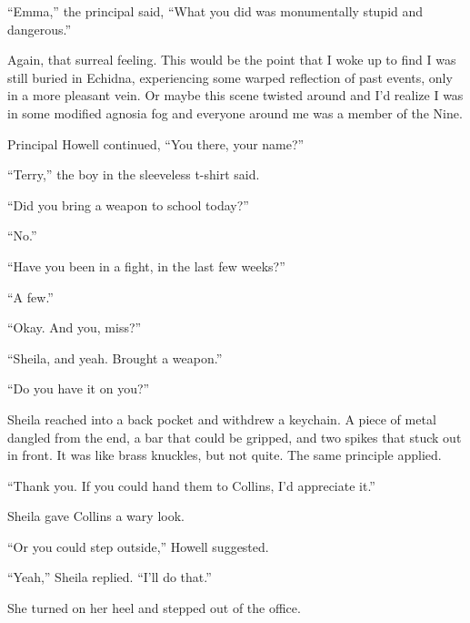 ``Emma,'' the principal said, ``What you did was monumentally stupid and dangerous.''



Again, that surreal feeling.  This would be the point that I woke up to find I was still buried in Echidna, experiencing some warped reflection of past events, only in a more pleasant vein.  Or maybe this scene twisted around and I'd realize I was in some modified agnosia fog and everyone around me was a member of the Nine.



Principal Howell continued, ``You there, your name?''



``Terry,'' the boy in the sleeveless t-shirt said.



``Did you bring a weapon to school today?''



``No.''



``Have you been in a fight, in the last few weeks?''



``A few.''



``Okay.  And you, miss?''



``Sheila, and yeah.  Brought a weapon.''



``Do you have it on you?''



Sheila reached into a back pocket and withdrew a keychain.  A piece of metal dangled from the end, a bar that could be gripped, and two spikes that stuck out in front.  It was like brass knuckles, but not quite.  The same principle applied.



``Thank you.  If you could hand them to Collins, I'd appreciate it.''



Sheila gave Collins a wary look.



``Or you could step outside,'' Howell suggested.



``Yeah,'' Sheila replied. ``I'll do that.''



She turned on her heel and stepped out of the office.



